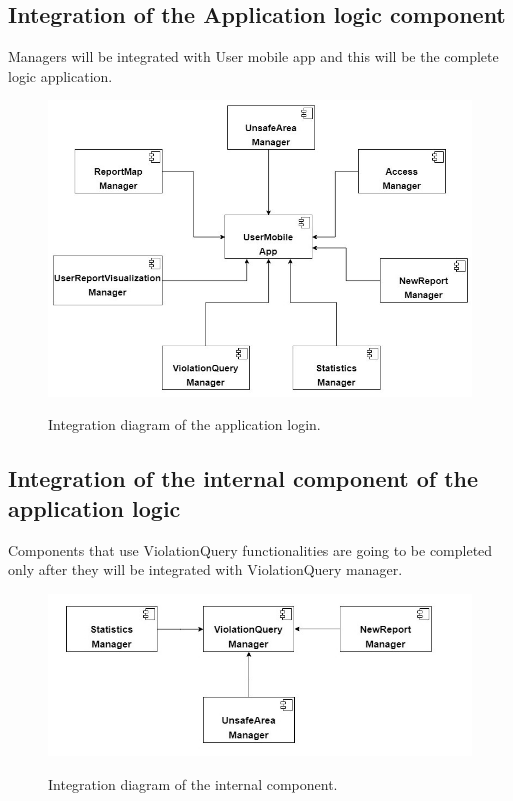 \documentclass[../RASD.tex]{subfiles}
\begin{document}
    \subsection{Integration of the Application logic component}\label{subsec:integration-of-the-application-logic-component}
    Managers will be integrated with User mobile app and this will be the complete logic application.
    \begin{figure}[H]
        \centering
        \includegraphics[scale = 0.8]{assets/integration_diagrams/user_mobile_app_integration.png}\\[1.6 cm]
        \caption[\textit{Integration} Diagram of the application logic]{Integration diagram of the application login.}
    \end{figure}
    \subsection{Integration of the internal component of the application logic}\label{subsec:integration-of-the-internal-component-of-the-application-logic}
    Components that use ViolationQuery functionalities are going to be completed only after they will be integrated with ViolationQuery manager.
    \\
    \begin{figure}[H]
        \centering
        \includegraphics[scale = 0.8]{assets/integration_diagrams/violation_query_integration.png}\\[1.6 cm]
        \caption[\textit{Integration} Diagram of the internal component]{Integration diagram of the internal component.}
    \end{figure}
    \newpage
\end{document}
